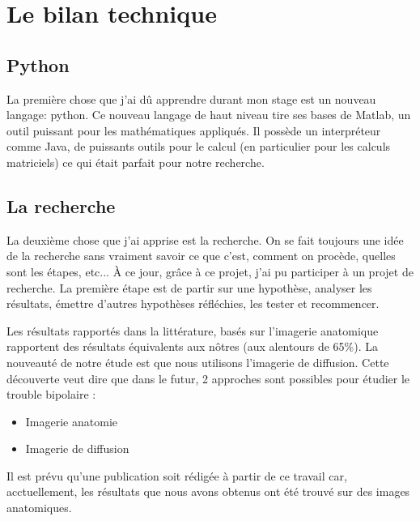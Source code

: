\section{Le bilan technique}

\subsection{Python}

La première chose que j'ai dû apprendre durant mon stage est un nouveau langage: python. 
Ce nouveau langage de haut niveau tire ses bases de Matlab, un outil puissant pour les mathématiques appliqués. 
Il possède un interpréteur comme Java, de puissants outils pour le calcul (en particulier pour les calculs matriciels) ce qui était parfait pour notre recherche.


\subsection{La recherche}

La deuxième chose que j'ai apprise est la recherche. On se fait toujours une idée de la recherche sans vraiment savoir ce que c'est, comment on procède, quelles sont les étapes, etc... 
À ce jour, grâce à ce projet, j'ai pu participer à un projet de recherche. La première étape est de partir sur une hypothèse, analyser les résultats, émettre d'autres hypothèses réfléchies, les tester et recommencer.


Les résultats rapportés dans la littérature, basés sur l'imagerie anatomique rapportent des résultats équivalents aux nôtres (aux alentours de 65\%).
La nouveauté de notre étude est que nous utilisons l'imagerie de diffusion.
Cette découverte veut dire que dans le futur, 2 approches sont possibles pour étudier le trouble bipolaire :
\begin{itemize}
	\item Imagerie anatomie
	\item Imagerie de diffusion
\end{itemize}

Il est prévu qu'une publication soit rédigée à partir de ce travail car, acctuellement, les résultats que nous avons obtenus ont été trouvé sur des images anatomiques. 